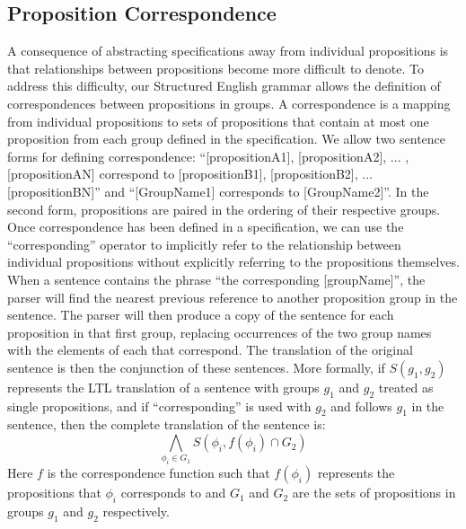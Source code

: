 \subsection{Proposition Correspondence} 
A consequence of abstracting specifications away from individual propositions is that relationships between propositions become more difficult to denote. To address this difficulty, our Structured English grammar allows the definition of correspondences between propositions in groups. A correspondence is a mapping from individual propositions to sets of propositions that contain at most one proposition from each group defined in the specification. We allow two sentence forms for defining correspondence: ``[propositionA1], [propositionA2], ... , [propositionAN] correspond to [propositionB1], [propositionB2], ... [propositionBN]'' and ``[GroupName1] corresponds to [GroupName2]''. In the second form, propositions are paired in the ordering of their respective groups. Once correspondence has been defined in a specification, we can use the ``corresponding'' operator to implicitly refer to the relationship between individual propositions without explicitly referring to the propositions themselves. When a sentence contains the phrase ``the corresponding [groupName]'', the parser will find the nearest previous reference to another proposition group in the sentence. The parser will then produce a copy of the sentence for each proposition in that first group, replacing occurrences of the two group names with the elements of each that correspond. The translation of the original sentence is then the conjunction of these sentences. More formally, if $S(g_1,g_2)$ represents the LTL translation of a sentence with groups $g_1$ and $g_2$ treated as single propositions, and if ``corresponding'' is used with $g_2$ and follows $g_1$ in the sentence, then the complete translation of the sentence is:
\begin{equation*}
	\bigwedge \limits_{\phi_i \in G_1} S(\phi_i, f(\phi_i) \cap G_2)
\end{equation*}
Here $f$ is the correspondence function such that $f(\phi_i)$ represents the propositions that $\phi_i$ corresponds to and $G_1$ and $G_2$ are the sets of propositions in groups $g_1$ and $g_2$ respectively. 

